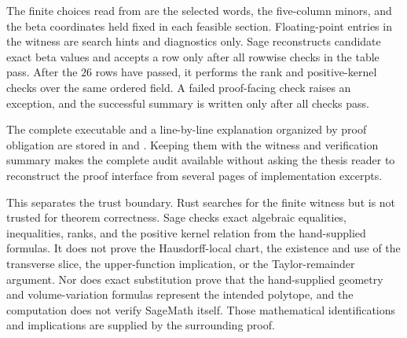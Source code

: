 The finite choices read from  are the selected words, the
five-column minors, and the beta coordinates held fixed in each feasible
section.  Floating-point entries in the witness are search hints and
diagnostics only.  Sage reconstructs candidate exact beta values and accepts a
row only after all rowwise checks in the table pass.  After the \(26\) rows
have passed, it performs the rank and positive-kernel checks over the same
ordered field.  A failed proof-facing check raises an exception, and the
successful summary is written only after all checks pass.

The complete executable and a line-by-line explanation organized by proof
obligation are stored in
 and
.
Keeping them with the witness and verification summary makes the complete
audit available without asking the thesis reader to reconstruct the proof
interface from several pages of implementation excerpts.

This separates the trust boundary.  Rust searches for the finite witness but
is not trusted for theorem correctness.  Sage checks exact algebraic
equalities, inequalities, ranks, and the positive kernel relation from the
hand-supplied formulas.  It does not prove the Hausdorff-local chart, the
existence and use of the transverse slice, the upper-function implication, or
the Taylor-remainder argument.  Nor does exact substitution prove that the
hand-supplied geometry and volume-variation formulas represent the intended
polytope, and the computation does not verify SageMath itself.  Those
mathematical identifications and implications are supplied by the surrounding
proof.
